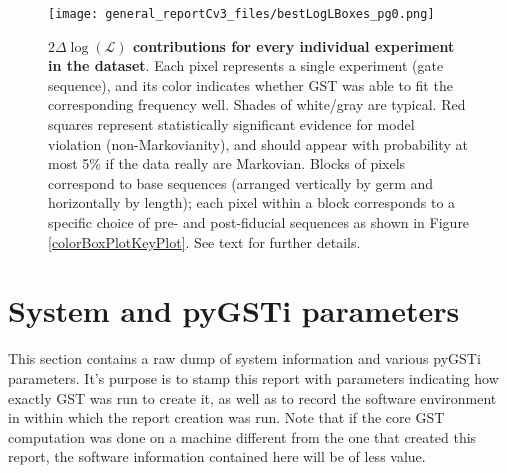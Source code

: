 \documentclass{article}[11pt]
\begin{document}
{\begin{figure}
\begin{center}
\texttt{[image: general\_reportCv3\_files/bestLogLBoxes\_pg0.png]}
\caption{\textbf{$2\Delta\log(\mathcal{L})$ contributions for every individual experiment in the dataset}.   Each pixel represents a single experiment (gate sequence), and its color indicates whether GST was able to fit the corresponding frequency well.  Shades of white/gray are typical. Red squares represent statistically significant evidence for model violation (non-Markovianity), and should appear with probability at most 5\% if the data really are Markovian. Blocks of pixels correspond to base sequences (arranged vertically by germ and horizontally by length); each pixel within a block corresponds to a specific choice of pre- and post-fiducial sequences as shown in Figure \ref{colorBoxPlotKeyPlot}.  See text for further details.\label{bestEstimateColorBoxPlot}}
\end{center}
\end{figure}

%

}{}


\section{System and pyGSTi parameters\label{metadata}}
This section contains a raw dump of system information and various pyGSTi parameters.  It's purpose is to stamp this report with parameters indicating how exactly GST was run to create it, as well as to record the software environment in within which the report creation was run.  Note that if the core GST computation was done on a machine different from the one that created this report, the software information contained here will be of less value.
\end{document}

